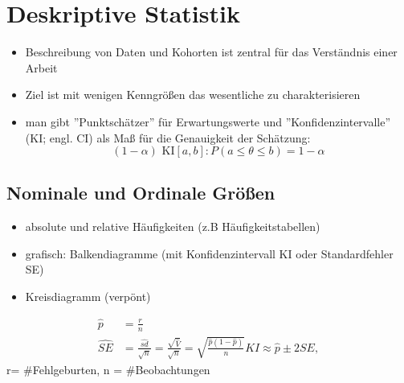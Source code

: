 \chapter{Deskriptive Statistik}
\begin{itemize}
	\item Beschreibung von Daten und Kohorten ist zentral für das Verständnis einer Arbeit
	\item Ziel ist mit wenigen Kenngrößen das wesentliche zu charakterisieren 
	\item man gibt ''Punktschätzer''  für Erwartungswerte und ''Konfidenzintervalle'' (KI; engl. CI) als Maß für die Genauigkeit der Schätzung:
	\[(1- \alpha) \text{ KI} [a,b] : P(a \leq \theta \leq b) = 1-\alpha\]
\end{itemize}
\section{Nominale und Ordinale Größen}

\begin{itemize}
	\item absolute und relative Häufigkeiten (z.B Häufigkeitstabellen)
	\item grafisch: Balkendiagramme (mit Konfidenzintervall KI oder Standardfehler SE)
	\item Kreisdiagramm (verpönt)
\end{itemize}
\begin{align*}	
	\hat{p} &= \frac{r}{n}\\
	\hat{SE} &= \frac{\hat{sd}}{\sqrt{n}}= \frac{\sqrt{\hat{V}}}{\sqrt{n}} = \sqrt{\frac{\hat{p} (1- \hat{p})}{n}}
	KI \approx \hat{p} \pm 2 SE,
\end{align*}
r= \#Fehlgeburten, n = \#Beobachtungen 



